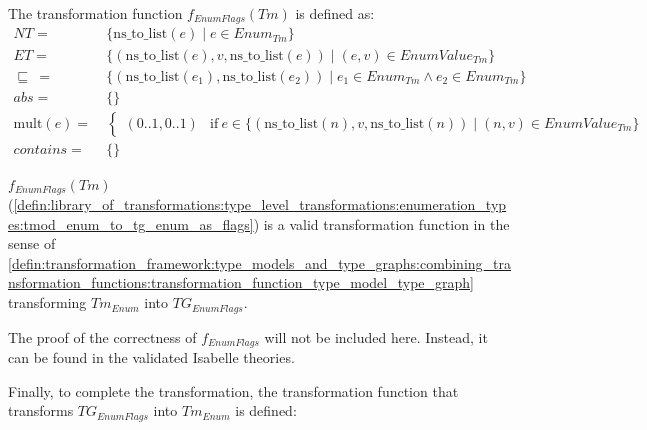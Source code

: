 \begin{defin}
\label{defin:library_of_transformations:type_level_transformations:enumeration_types:tmod_enum_to_tg_enum_as_flags}
The transformation function $f_{EnumFlags}(Tm)$ is defined as:
\begin{align*}
NT =\ &\{\mathrm{ns\_\!to\_\!list}(e) \mid e \in Enum_{Tm}\} \\
ET =\ &\{(\mathrm{ns\_\!to\_\!list}(e), v, \mathrm{ns\_\!to\_\!list}(e)) \mid (e, v) \in EnumValue_{Tm}\} \\
\!\!\sqsubseteq\ =\ &\{(\mathrm{ns\_\!to\_\!list}(e_1), \mathrm{ns\_\!to\_\!list}(e_2)) \mid e_1 \in Enum_{Tm} \land e_2 \in Enum_{Tm} \} \\
abs =\ &\{\} \\
\mathrm{mult}(e) =\ &\begin{cases}
    (0..1, 0..1) &\mathrm{if}\ e \in \{(\mathrm{ns\_\!to\_\!list}(n), v, \mathrm{ns\_\!to\_\!list}(n)) \mid (n, v) \in EnumValue_{Tm}\}
\end{cases}\\
contains =\ &\{\}
\end{align*}
\end{defin}

\begin{thm}
\label{defin:library_of_transformations:type_level_transformations:enumeration_types:tmod_enum_to_tg_enum_as_flags_func}
$f_{EnumFlags}(Tm)$ (\cref{defin:library_of_transformations:type_level_transformations:enumeration_types:tmod_enum_to_tg_enum_as_flags}) is a valid transformation function in the sense of \cref{defin:transformation_framework:type_models_and_type_graphs:combining_transformation_functions:transformation_function_type_model_type_graph} transforming $Tm_{Enum}$ into $TG_{EnumFlags}$.
\end{thm}

The proof of the correctness of $f_{EnumFlags}$ will not be included here. Instead, it can be found in the validated Isabelle theories.

Finally, to complete the transformation, the transformation function that transforms $TG_{EnumFlags}$ into $Tm_{Enum}$ is defined:

